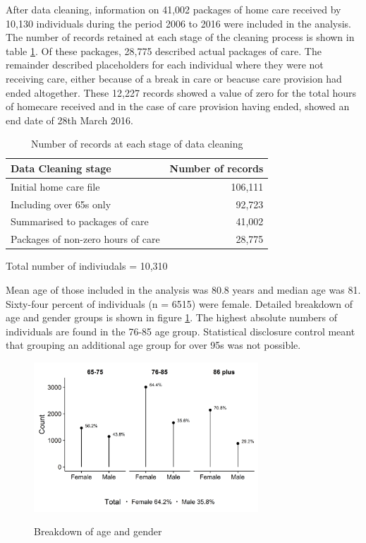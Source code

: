 \documentclass[]{article}
\begin{document}
After data cleaning, information on 41,002 packages of home care
received by 10,130 individuals during the period 2006 to 2016 were
included in the analysis. The number of records retained at each stage
of the cleaning process is shown in table \ref{tab:renf-cleaning}. Of
these packages, 28,775 described actual packages of care. The remainder
described placeholders for each individual where they were not receiving
care, either because of a break in care or beacuse care provision had
ended altogether. These 12,227 records showed a value of zero for the
total hours of homecare received and in the case of care provision
having ended, showed an end date of 28th March 2016.

\begin{table}[]
\centering
\caption{Number of records at each stage of data cleaning}
\label{tab:renf-cleaning}
\begin{threeparttable}
\begin{tabular}{@{}lr@{}}
\toprule
Data Cleaning stage                & Number of records \\ \midrule
Initial home care file             & 106,111           \\
Including over 65s only            & 92,723             \\
Summarised to packages of care     & 41,002\tnote{1}    \\ 
Packages of non-zero hours of care & 28,775             \\ \bottomrule
\end{tabular}
\begin{tablenotes}
\item[1] Total number of indiviudals = 10,310
\end{tablenotes}
\end{threeparttable}
\end{table}

Mean age of those included in the analysis was 80.8 years and median age
was 81. Sixty-four percent of individuals (n = 6515) were female.
Detailed breakdown of age and gender groups is shown in figure
\ref{fig:ren-age-gen}. The highest absolute numbers of individuals are
found in the 76-85 age group. Statistical disclosure control meant that
grouping an additional age group for over 95s was not possible.

\begin{figure}[h]
  \centering
    \caption{Breakdown of age and gender}
    \includegraphics[width = 0.75\textwidth]{figures/chapter-renf/01-age-gender-ts-subset.png}
    \label{fig:ren-age-gen}
\end{figure}
\end{document}
